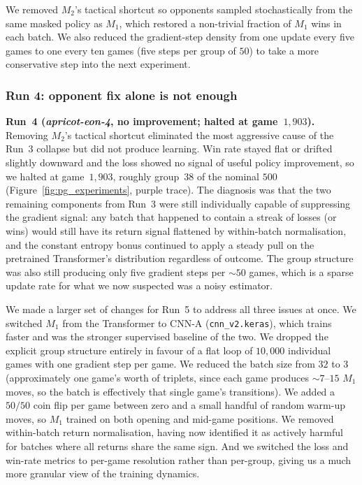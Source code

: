 \documentclass[11pt]{article}
\begin{document}
We removed $M_2$'s tactical shortcut so opponents sampled stochastically
from the same masked policy as $M_1$, which restored a non-trivial
fraction of $M_1$ wins in each batch. We also reduced the gradient-step
density from one update every five games to one every ten games (five
steps per group of $50$) to take a more conservative step into the
next experiment.

\subsubsection{Run 4: opponent fix alone is not enough}
\label{sssec:pg_run4}

\textbf{Run~4 (\emph{apricot-eon-4}, no improvement; halted at
game~$1{,}903$).}
Removing $M_2$'s tactical shortcut eliminated the most aggressive
cause of the Run~3 collapse but did not produce learning. Win rate
stayed flat or drifted slightly downward and the loss showed no
signal of useful policy improvement, so we halted at game~$1{,}903$,
roughly group~$38$ of the nominal $500$
(Figure~\ref{fig:pg_experiments}, purple trace). The diagnosis was that the two remaining components
from Run~3 were still individually capable of suppressing the
gradient signal: any batch that happened to contain a streak of
losses (or wins) would still have its return signal flattened by
within-batch normalisation, and the constant entropy bonus continued
to apply a steady pull on the pretrained Transformer's distribution
regardless of outcome. The group structure was also still producing
only five gradient steps per $\sim\!50$ games, which is a sparse
update rate for what we now suspected was a noisy estimator.

We made a larger set of changes for Run~5 to address all three issues
at once. We switched $M_1$ from the Transformer to CNN-A
(\texttt{cnn\_v2.keras}), which trains faster and was the stronger
supervised baseline of the two. We dropped the explicit group
structure entirely in favour of a flat loop of $10{,}000$ individual
games with one gradient step per game. We reduced the batch size
from $32$ to $3$ (approximately one game's worth of triplets, since
each game produces $\sim 7$--$15$ $M_1$ moves, so the batch is
effectively that single game's transitions). We added a $50/50$ coin
flip per game between zero and a small handful of random warm-up
moves, so $M_1$ trained on both opening and mid-game positions. We
removed within-batch return normalisation, having now identified it
as actively harmful for batches where all returns share the same
sign. And we switched the loss and win-rate metrics to per-game
resolution rather than per-group, giving us a much more granular
view of the training dynamics.
\end{document}
